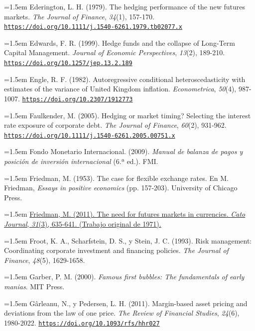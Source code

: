 \documentclass[10pt,a4paper]{article}
\begin{document}
\noindent\hangindent=1.5em Ederington, L. H. (1979). The hedging performance of the new futures markets. \textit{The Journal of Finance}, \textit{34}(1), 157-170. \href{https://doi.org/10.1111/j.1540-6261.1979.tb02077.x}{\nolinkurl{https://doi.org/10.1111/j.1540-6261.1979.tb02077.x}}

\noindent\hangindent=1.5em Edwards, F. R. (1999). Hedge funds and the collapse of Long-Term Capital Management. \textit{Journal of Economic Perspectives}, \textit{13}(2), 189-210. \href{https://doi.org/10.1257/jep.13.2.189}{\nolinkurl{https://doi.org/10.1257/jep.13.2.189}}

\noindent\hangindent=1.5em Engle, R. F. (1982). Autoregressive conditional heteroscedasticity with estimates of the variance of United Kingdom inflation. \textit{Econometrica}, \textit{50}(4), 987-1007. \href{https://doi.org/10.2307/1912773}{\nolinkurl{https://doi.org/10.2307/1912773}}

\noindent\hangindent=1.5em Faulkender, M. (2005). Hedging or market timing? Selecting the interest rate exposure of corporate debt. \textit{The Journal of Finance}, \textit{60}(2), 931-962. \href{https://doi.org/10.1111/j.1540-6261.2005.00751.x}{\nolinkurl{https://doi.org/10.1111/j.1540-6261.2005.00751.x}}

\noindent\hangindent=1.5em Fondo Monetario Internacional. (2009). \textit{Manual de balanza de pagos y posición de inversión internacional} (6.ª ed.). FMI.

\noindent\hangindent=1.5em Friedman, M. (1953). The case for flexible exchange rates. En M. Friedman, \textit{Essays in positive economics} (pp. 157-203). University of Chicago Press.

\noindent\hangindent=1.5em \href{https://www.cato.org/cato-journal/fall-2011/need-futures-markets-currencies}{Friedman, M. (2011). The need for futures markets in currencies. \textit{Cato Journal}, \textit{31}(3), 635-641. (Trabajo original de 1971).}

\noindent\hangindent=1.5em Froot, K. A., Scharfstein, D. S., y Stein, J. C. (1993). Risk management: Coordinating corporate investment and financing policies. \textit{The Journal of Finance}, \textit{48}(5), 1629-1658.

\noindent\hangindent=1.5em Garber, P. M. (2000). \textit{Famous first bubbles: The fundamentals of early manias}. MIT Press.

\noindent\hangindent=1.5em Gârleanu, N., y Pedersen, L. H. (2011). Margin-based asset pricing and deviations from the law of one price. \textit{The Review of Financial Studies}, \textit{24}(6), 1980-2022. \href{https://doi.org/10.1093/rfs/hhr027}{\nolinkurl{https://doi.org/10.1093/rfs/hhr027}}
\end{document}

